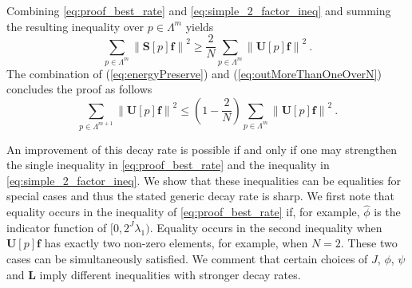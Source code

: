 \documentclass{article}
\def\BL{\boldsymbol{L}}
\def\BS{\boldsymbol{S}}
\def\BU{\boldsymbol{U}}
\def\Bf{\boldsymbol{f}}
\newcommand{\norm}[1]{\left\lVert#1\right\rVert}
\begin{document}
Combining \eqref{eq:proof_best_rate} and \eqref{eq:simple_2_factor_ineq} and summing the resulting inequality over $p \in \Lambda^m$ yields
\begin{equation}\label{eq:outMoreThanOneOverN}
\sum_{p \in \Lambda^m} \norm{\BS[p]\Bf}^2 \geq \frac{2}{N} \sum_{p \in \Lambda^m} \norm{\BU[p]\Bf}^2 ~.
\end{equation}
The combination of (\ref{eq:energyPreserve}) and (\ref{eq:outMoreThanOneOverN}) concludes the proof as follows
\begin{equation}
\sum_{p \in \Lambda^{m+1}} \norm{\BU[p] \Bf}^2 \leq \left( 1 - \frac{2}{N} \right) \sum_{p \in \Lambda^m} \norm{\BU[p] \Bf}^2 ~. 
\end{equation}

An improvement of this decay rate is possible if and only if one may strengthen the single inequality in \eqref{eq:proof_best_rate} and the inequality in \eqref{eq:simple_2_factor_ineq}. We show that these inequalities can be equalities for special cases and thus the stated generic decay rate is sharp. We first note that equality occurs in the inequality of \eqref{eq:proof_best_rate}  if, for example, $\hat{\phi}$ is the indicator function of $[0,2^J \lambda_1)$. Equality occurs in the second inequality when $\BU[p]\Bf$ has exactly two non-zero elements, for example, when $N=2$. 
These two cases can be simultaneously satisfied. 
We comment that certain choices of $J$, $\phi$, $\psi$ and $\BL$ imply different inequalities with stronger decay rates. 

 
\end{document}
